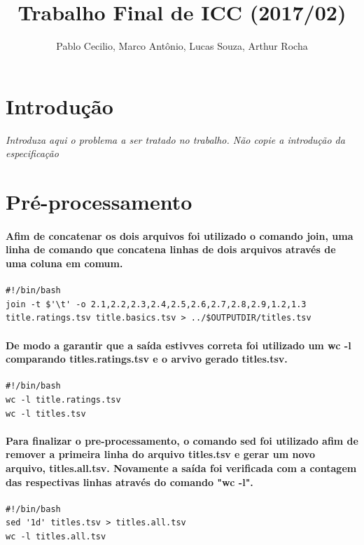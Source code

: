 \documentclass[12pt]{article}
\title{Trabalho Final de ICC (2017/02)}
\author{Pablo Cecilio, Marco Antônio, Lucas Souza, Arthur Rocha}
\date{}
\begin{document}
 
\maketitle

\section{Introdução}

\emph{Introduza aqui o problema a ser tratado no trabalho. Não copie a
introdução da especificação}

\section{Pré-processamento}

\paragraph{Afim de concatenar os dois arquivos foi utilizado o comando join, uma linha de comando que concatena linhas de dois arquivos através de uma coluna em comum.}

\begin{verbatim}
#!/bin/bash
join -t $'\t' -o 2.1,2.2,2.3,2.4,2.5,2.6,2.7,2.8,2.9,1.2,1.3 title.ratings.tsv title.basics.tsv > ../$OUTPUTDIR/titles.tsv
\end{verbatim}

\paragraph{De modo a garantir que a saída estivves correta foi utilizado um wc -l comparando titles.ratings.tsv e o arvivo gerado titles.tsv.}

\begin{verbatim}
#!/bin/bash
wc -l title.ratings.tsv
wc -l titles.tsv
\end{verbatim}

\paragraph{Para finalizar o pre-processamento, o comando sed foi utilizado afim de remover a primeira linha do arquivo titles.tsv e gerar um novo arquivo, titles.all.tsv. Novamente a saída foi verificada com a contagem das respectivas linhas através do comando "wc -l".}

\begin{verbatim}
#!/bin/bash
sed '1d' titles.tsv > titles.all.tsv
wc -l titles.all.tsv
\end{verbatim}
\end{document}
